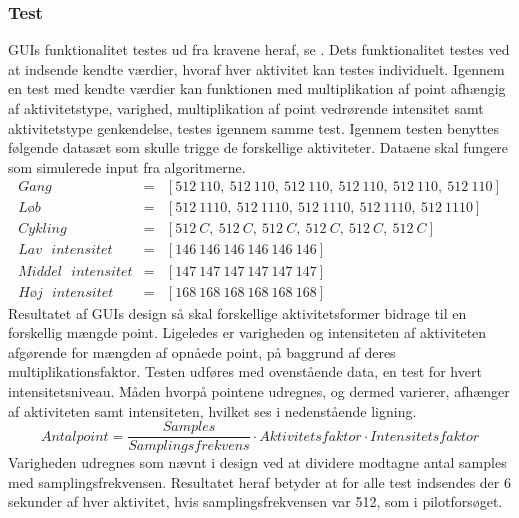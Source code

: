 \subsubsection{Test}
GUIs funktionalitet testes ud fra kravene heraf, se . Dets funktionalitet testes ved at indsende kendte værdier, hvoraf hver aktivitet kan testes individuelt. Igennem en test med kendte værdier kan funktionen med multiplikation af point afhængig af aktivitetstype, varighed, multiplikation af point vedrørende intensitet samt aktivitetstype genkendelse, testes igennem samme test.
Igennem testen benyttes følgende datasæt som skulle trigge de forskellige aktiviteter. Dataene skal fungere som simulerede input fra algoritmerne. 
\begin{eqnarray*}
	Gang &=& [512~110,~512~110,~512~110,~512~110,~512~110,~512~110] \\ 
	L\text{ø}b &=& [512~1110,~512~1110,~512~1110,~512~1110,~512~1110] \\ 
	Cykling &=& [512~C,~512~C,~512~C,~512~C,~512~C,~512~C] \\
	Lav\text{ }intensitet &=& [146~146~146~146~146~146] \\ 
	Middel\text{ }intensitet &=& [147~147~147~147~147~147] \\ 
	H\text{ø}j\text{ }intensitet &=& [168~168~168~168~168~168] 
\end{eqnarray*}
Resultatet af GUIs design så skal forskellige aktivitetsformer bidrage til en forskellig mængde point. Ligeledes er varigheden og intensiteten  af aktiviteten afgørende for mængden af opnåede point, på baggrund af deres multiplikationsfaktor. Testen udføres med ovenstående data, en test for hvert intensitetsniveau. Måden hvorpå pointene udregnes, og dermed varierer, afhænger af aktiviteten samt intensiteten, hvilket ses i nedenstående ligning. 
\begin{equation*}
Antal point = \frac{Samples}{Samplingsfrekvens} \cdot Aktivitetsfaktor \cdot Intensitetsfaktor
\end{equation*}
Varigheden udregnes som nævnt i design ved at dividere modtagne antal samples med samplingsfrekvensen. Resultatet heraf betyder at for alle test indsendes der 6 sekunder af hver aktivitet, hvis samplingsfrekvensen var 512, som i pilotforsøget.
